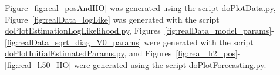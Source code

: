 \documentclass[12pt]{article}
\begin{document}
Figure~\ref{fig:real_posAndHO} was generated using the script
\href{https://github.com/joacorapela/lds_tracking_posOriMice/blob/master/code/scripts/doPlotData.py}{doPlotData.py},
Figure~\ref{fig:realData_logLike} was generated with the script
\href{https://github.com/joacorapela/lds_tracking_posOriMice/blob/master/code/scripts/doPlotEstimationLogLikelihood.py}{doPlotEstimationLogLikelihood.py},
Figures~\ref{fig:realData_model_params}-\ref{fig:realData_sqrt_diag_V0_params}
were generated with the script
\href{https://github.com/joacorapela/lds_tracking_posOriMice/blob/master/code/scripts/doPlotInitialEstimatedParams.py}{doPlotInitialEstimatedParams.py},
and Figures~\ref{fig:real_h2_pos}-\ref{fig:real_h50_HO} were generated using the script
\href{https://github.com/joacorapela/lds_tracking_posOriMice/blob/master/code/scripts/doPlotForecasting.py}{doPlotForecasting.py}.
\end{document}
